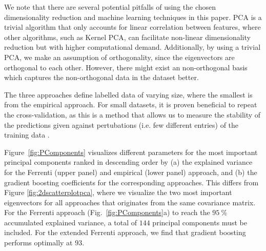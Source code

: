 \documentclass[superscriptaddress,unsortedaddress,
 amsmath,amssymb,
 aps,
]{revtex4-2}
\begin{document}
We note that there are several potential pitfalls of using the chosen dimensionality reduction and machine learning techniques in this paper. PCA is a trivial algorithm that only accounts for linear correlation between features, where other algorithms, such as Kernel PCA, can facilitate non-linear dimensionality reduction but with higher computational demand. Additionally, by using a trivial PCA, we make an assumption of orthogonality, since the eigenvectors are orthogonal to each other. However, there might exist an non-orthogonal basis which captures the non-orthogonal data in the dataset better. 

The three approaches define labelled data of varying size, where the smallest is from the empirical approach. For small datasets, it is proven beneficial to repeat the cross-validation, as this is a method that allows us to measure the stability of the predictions given against pertubations (i.e. few different entries) of the training data \cite{Beleites2008}.

Figure~\ref{fig:PComponents} visualizes different parameters for the most important principal components ranked in descending order by (a) the explained variance for the Ferrenti (upper panel) and empirical (lower panel) approach, and (b) the gradient boosting coefficients for the corresponding approaches. This differs from Figure \ref{fig:2dscatterplotpca}, where we visualize the two most important eigenvectors for all approaches that originates from the same covariance matrix.
For the Ferrenti approach (Fig.~\ref{fig:PComponents}a) to reach the $95 \ \%$ accumulated explained variance, a total of $144$ principal components must be included. For the extended Ferrenti approach, we find that gradient boosting performs optimally at $93$. 
\end{document}
